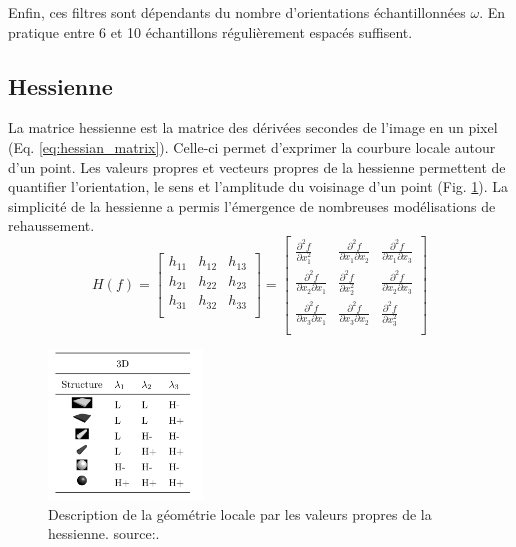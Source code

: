 Enfin, ces filtres sont dépendants du nombre d'orientations échantillonnées $\omega$. En pratique entre 6 et 10 échantillons régulièrement espacés suffisent. 

\subsection{Hessienne}
\label{sec:EA:rehaussement:hessienne}

La matrice hessienne est la matrice des dérivées secondes de l'image en un pixel (Eq. \ref{eq:hessian_matrix}). Celle-ci permet d'exprimer la courbure locale autour d'un point.
Les valeurs propres et vecteurs propres de la hessienne permettent de quantifier l'orientation, le sens et l'amplitude du voisinage d'un point (Fig. \ref{fig:structures_hessienne}).
La simplicité de la hessienne a permis l'émergence de nombreuses modélisations de rehaussement.
\begin{equation}
  H(f) =
  \begin{bmatrix}
  h_{11} & h_{12} & h_{13} \\
  h_{21} & h_{22} & h_{23} \\
  h_{31} & h_{32} & h_{33} \\
  \end{bmatrix}
    =
  \begin{bmatrix}
  \frac{\partial^2 f}{\partial x^2_1} & \frac{\partial^2 f}{\partial x_1 \partial x_2} & \frac{\partial^2 f}{\partial x_1 \partial x_3} \\
  \frac{\partial^2 f}{\partial x_2 \partial x_1} & \frac{\partial^2 f}{\partial x^2_2} & \frac{\partial^2 f}{\partial x_2 \partial x_3} \\
  \frac{\partial^2 f}{\partial x_3 \partial x_1} & \frac{\partial^2 f}{\partial x_3 \partial x_2} & \frac{\partial^2 f}{\partial x^2_3} \\
  \end{bmatrix}
  \nonumber
  \label{eq:hessian_matrix}
\end{equation}
\begin{figure}[!ht]
  \centering
  \includegraphics[height=4cm]{Images/table_structures_jerman.png}
  \caption{Description de la géométrie locale par les valeurs propres de la hessienne. source:\cite{Jerman2015_beyond_frangi}.}
  \label{fig:structures_hessienne}
\end{figure}

